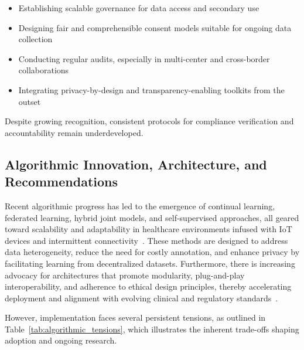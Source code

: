\begin{itemize}
    \item Establishing scalable governance for data access and secondary use
    \item Designing fair and comprehensible consent models suitable for ongoing data collection
    \item Conducting regular audits, especially in multi-center and cross-border collaborations
    \item Integrating privacy-by-design and transparency-enabling toolkits from the outset
\end{itemize}

Despite growing recognition, consistent protocols for compliance verification and accountability remain underdeveloped.

\subsection{Algorithmic Innovation, Architecture, and Recommendations}

Recent algorithmic progress has led to the emergence of continual learning, federated learning, hybrid joint models, and self-supervised approaches, all geared toward scalability and adaptability in healthcare environments infused with IoT devices and intermittent connectivity~\cite{ref36, ref37, ref42, ref43, ref46, ref50, ref54, ref61, ref65, ref70, ref71, ref72, ref74, ref75, ref76, ref77, ref78, ref79, ref90, ref104, ref105, ref107}. These methods are designed to address data heterogeneity, reduce the need for costly annotation, and enhance privacy by facilitating learning from decentralized datasets. Furthermore, there is increasing advocacy for architectures that promote modularity, plug-and-play interoperability, and adherence to ethical design principles, thereby accelerating deployment and alignment with evolving clinical and regulatory standards~\cite{ref7, ref11, ref12, ref13, ref14, ref16, ref17, ref18, ref19, ref20, ref21, ref22, ref23, ref24, ref25, ref28, ref30, ref32, ref33, ref34, ref35, ref41, ref43, ref44, ref45, ref46, ref49, ref50, ref60, ref61, ref62, ref63, ref64, ref65, ref70, ref71, ref72, ref73, ref74, ref75, ref76, ref77, ref78, ref79, ref80, ref84, ref106, ref107}.

However, implementation faces several persistent tensions, as outlined in Table~\ref{tab:algorithmic_tensions}, which illustrates the inherent trade-offs shaping adoption and ongoing research.

